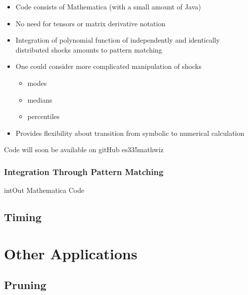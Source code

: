 \documentclass[12pt]{article}
\begin{document}
  \begin{itemize}
  \item Code consists of Mathematica (with a small amount of Java)
  \item No need for tensors or matrix derivative notation
  \item Integration of polynomial function of independently and identically distributed shocks amounts to pattern matching
  \item One could consider more complicated manipulation of shocks
    \begin{itemize}
    \item modes
\item  medians 
\item percentiles
    \end{itemize}
   \item Provides flexibility about transition from symbolic to numerical calculation
  \end{itemize}


{\small Code will soon be available on gitHub es335mathwiz }




\subsubsection{Integration Through Pattern Matching}
\label{sec:integr-thro-patt}

{intOut Mathematica Code}

{\tiny
{}
}


\subsection{Timing}
\label{sec:timing}



\section{Other Applications}
\label{sec:other-applications}

\subsection{Pruning}
\label{sec:pruning}
\end{document}
